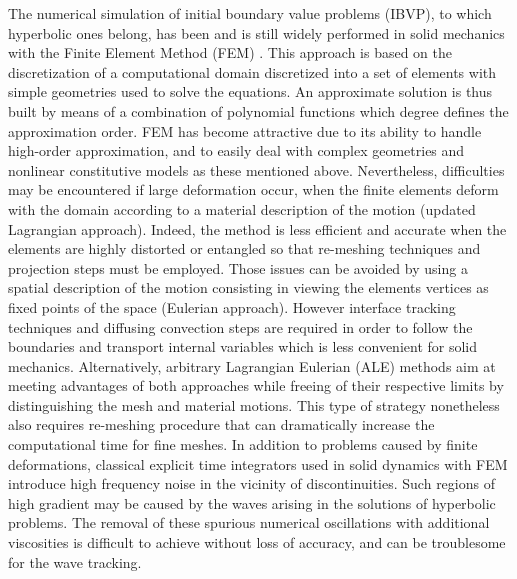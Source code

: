The numerical simulation of initial boundary value problems (IBVP), to which hyperbolic ones belong, has been and is still widely performed in solid mechanics with the Finite Element Method (FEM) \cite{Belytschko}.
This approach is based on the discretization of a computational domain discretized into a set of elements with simple geometries used to solve the equations.
An approximate solution is thus built by means of a combination of polynomial functions which degree defines the approximation order.
FEM has become attractive due to its ability to handle high-order approximation, and to easily deal with complex geometries and nonlinear constitutive models as these mentioned above.  %
Nevertheless, difficulties may be encountered if large deformation occur, when the finite elements deform with the domain according to a material description of the motion (updated Lagrangian approach).
Indeed, the method is less efficient and accurate when the elements are highly distorted or entangled so that re-meshing techniques and projection steps must be employed.
Those issues can be avoided by using a spatial description of the motion consisting in viewing the elements vertices as fixed points of the space (Eulerian approach).
However interface tracking techniques and diffusing convection steps are required in order to follow the boundaries and transport internal variables which is less convenient for solid mechanics.
Alternatively, arbitrary Lagrangian Eulerian (ALE) methods aim at meeting advantages of both approaches while freeing of their respective limits by distinguishing the mesh and material motions.
This type of strategy nonetheless also requires re-meshing procedure that can dramatically increase the computational time for fine meshes.
In addition to problems caused by finite deformations, classical explicit time integrators used in solid dynamics with FEM introduce high frequency noise in the vicinity of discontinuities.
Such regions of high gradient may be caused by the waves arising in the solutions of hyperbolic problems.
The removal of these spurious numerical oscillations with additional viscosities is difficult to achieve without loss of accuracy, and can be troublesome for the wave tracking.

